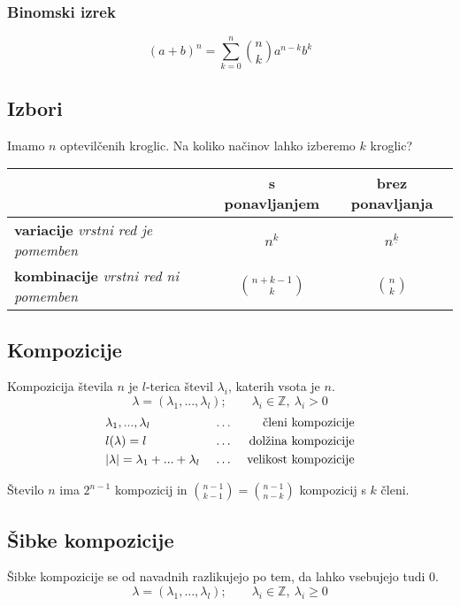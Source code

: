 \documentclass[11pt,a4paper]{article}
\begin{document}
\subsubsection*{Binomski izrek}
\[(a+b)^n = \sum_{k=0}^n \binom{n}{k} a^{n-k} b^k\]

\subsection*{Izbori}
Imamo $n$ optevilčenih kroglic. Na koliko načinov lahko izberemo $k$ kroglic?

\begin{center}
    \begin{tabular}{ m{6em} | c | c | } 
         & \textbf{s ponavljanjem} & \textbf{brez ponavljanja}\\ 
        \hline
        \textbf{variacije} \emph{vrstni red je pomemben} & $n^k$ & $n^{\underline{k}}$ \\ 
        \hline
        \textbf{kombinacije} \emph{vrstni red ni pomemben} & $\binom{n+k-1}{k}$ & $\binom{n}{k}$ \\ 
    \end{tabular}
\end{center}

\subsection*{Kompozicije}
Kompozicija števila $n$ je $l$-terica števil $\lambda_i$, katerih vsota je $n$.
\[\lambda = (\lambda_1, ..., \lambda_l); \qquad \lambda_i \in \mathbb{Z}, \ \lambda_i > 0\]
\begin{align*}
    &\lambda_1, ..., \lambda_l\                 &   \ldots & \ &\textmd{členi kompozicije} \\
    &l(\lambda) = l\                            &   \ldots & \ &\textmd{dolžina kompozicije} \\
    &|\lambda| = \lambda_1 + ... + \lambda_l\   &   \ldots & \ &\textmd{velikost kompozicije} \\
\end{align*}

Število $n$ ima $2^{n-1}$ kompozicij in $\binom{n-1}{k-1} = \binom{n-1}{n-k}$ kompozicij s $k$ členi. 

\subsection*{Šibke kompozicije}
Šibke kompozicije se od navadnih razlikujejo po tem, da lahko vsebujejo tudi $0$.
\[\lambda = (\lambda_1, ..., \lambda_l); \qquad \lambda_i \in \mathbb{Z}, \ \lambda_i \geq 0\]
\end{document}
